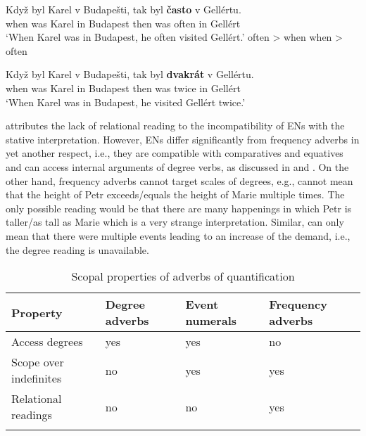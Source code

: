 \documentclass[output=paper,
modfonts,
hidelinks,
newtxmath
]{langscibook}
\begin{document}
\ea\label{casto-(non)relational-reading} \gll Když byl Karel v Budapešti, tak byl \textbf{často} v Gellértu.\\
when was Karel in Budapest then was often in Gellért\\
\glt `When Karel was in Budapest, he often visited Gellért.'
\ea often \textgreater{} when\label{casto-relational-reading}
\ex when \textgreater{} often\label{casto-non-relational-reading}
\z \z

\ea\label{dvakrat-(non)relational-reading} \gll Když byl Karel v Budapešti, tak byl \textbf{dvakrát} v Gellértu.\\
when was Karel in Budapest then was twice in Gellért\\
\glt `When Karel was in Budapest, he visited Gellért twice.'
\z \z

\noindent \cite{doetjes_adverbs_2007} attributes the lack of relational reading to the incompatibility of ENs with the stative interpretation. However, ENs differ significantly from frequency adverbs in yet another respect, i.e., they are compatible with comparatives and equatives and can access internal arguments of degree verbs, as discussed in  and . On the other hand, frequency adverbs cannot target scales of degrees, e.g.,  cannot mean that the height of Petr exceeds/equals the height of Marie multiple times. The only possible reading would be that there are many happenings in which Petr is taller/as tall as Marie which is a very strange interpretation. Similar,  can only mean that there were multiple events leading to an increase of the demand, i.e., the degree reading is unavailable.

\z

\z

\begin{table}[b]
\caption{Scopal properties of adverbs of quantification}\label{table:scale}
\begin{tabularx}{\textwidth}{@{}llll@{}}
\lsptoprule
Property & Degree adverbs & Event numerals & Frequency adverbs\tabularnewline
\midrule
Access degrees & yes & yes & no\tabularnewline
Scope over indefinites & no & yes & yes\tabularnewline
Relational readings & no & no & yes\tabularnewline
\lspbottomrule
\end{tabularx}
\end{table}
\end{document}
